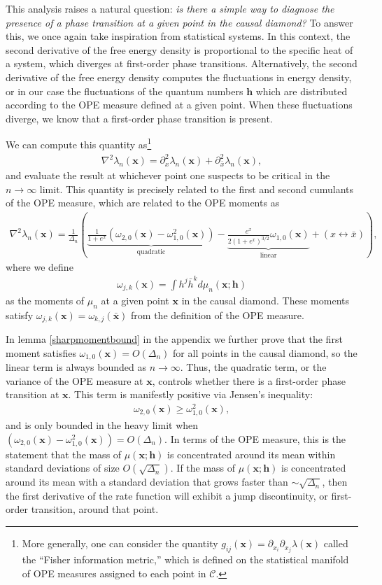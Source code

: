 \documentclass[a4paper,11pt]{article}
\theoremstyle{plain}
\theoremstyle{definition}
\theoremstyle{remark}
\newcommand{\bs}[1]{\boldsymbol{#1}}
\newcommand{\ba}{\begin{equation} \begin{aligned}}
\newcommand{\ea}{\end{aligned} \end{equation}}
\newcommand{\De}{\Delta}
\begin{document}
This analysis raises a natural question: \textit{is there a simple way to diagnose the presence of a phase transition at a given point in the causal diamond?} To answer this, we once again take inspiration from statistical systems. In this context, the second derivative of the free energy density is proportional to the specific heat of a system, which diverges at first-order phase transitions. Alternatively, the second derivative of the free energy density computes the fluctuations in energy density, or in our case the fluctuations of the quantum numbers $\bs{h}$ which are distributed according to the OPE measure defined at a given point. When these fluctuations diverge, we know that a first-order phase transition is present. 

We can compute this quantity as\footnote{More generally, one can consider the quantity $g_{ij}(\bs{x}) = \partial_{x_i}\partial_{x_j}\lambda(\bs{x})$ called the ``Fisher information metric,'' which is defined on the statistical manifold of OPE measures assigned to each point in $\mathscr{C}$.}
\ba
\nabla^2 \lambda_n(\bs{x}) = \partial_x^2\lambda_n(\bs{x}) + \partial_{\bar{x}}^2\lambda_n(\bs{x}) ,
\ea
and evaluate the result at whichever point one suspects to be critical in the $n \to \infty$ limit. This quantity is precisely related to the first and second cumulants of the OPE measure, which are related to the OPE moments as
\ba
\label{totalfluctations}
\nabla^2 \lambda_n(\bs{x}) = \frac{1}{\De_n}\left(  \underbrace{\frac{1}{1+e^x}\left(\omega_{2,0}(\bs{x}) - \omega_{1,0}^2(\bs{x}) \right)}_{\text{quadratic}}- \underbrace{\frac{e^{x}}{2(1+e^x)^{3/2}} \omega_{1,0}(\bs{x})}_{\text{linear}} + (x \leftrightarrow \bar{x})\right),
\ea
where we define
\ba
\omega_{j,k}(\bs{x}) = \int  h^j \bar{h}^k d\mu_n(\bs{x};\bs{h})
\ea
as the moments of $\mu_n$ at a given point $\bs{x}$ in the causal diamond. These moments satisfy $\omega_{j,k}(\bs{x}) = \omega_{k,j}(\bar{\bs{x}})$ from the definition of the OPE measure. 

In lemma \ref{sharpmomentbound} in the appendix we further prove that the first moment satisfies $\omega_{1,0}(\bs{x}) = O(\De_n)$ for all points in the causal diamond, so the linear term is always bounded as $n\to\infty$. Thus, the quadratic term, or the variance of the OPE measure at $\bs{x}$, controls whether there is a first-order phase transition at $\bs{x}$. This term is manifestly positive via Jensen's inequality:
\ba
\omega_{2,0}(\bs{x}) \geq \omega_{1,0}^2(\bs{x}),
\ea
and is only bounded in the heavy limit when $\left(\omega_{2,0}(\bs{x}) -\omega_{1,0}^2(\bs{x}) \right) = O(\De_n)$. In terms of the OPE measure, this is the statement that the mass of $\mu(\bs{x};\bs{h})$ is concentrated around its mean within standard deviations of size $O(\sqrt{\De_n})$. If the mass of $\mu(\bs{x};\bs{h})$ is concentrated around its mean with a standard deviation that grows faster than $\sim \sqrt{\De_n}$, then the first derivative of the rate function will exhibit a jump discontinuity, or first-order transition, around that point.
 
\end{document}
